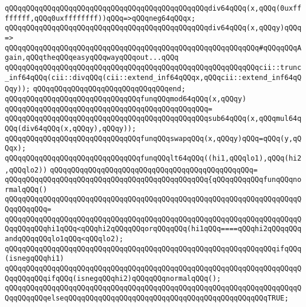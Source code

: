 \verb|qQQqqQQqqQQqqQQqqQQqqQQqqQQqqQQqqQQqqQQqqQQqqQQqdiv64qQQq(x,qQQq(0uxffffffff,qQQq0uxffffffff))qQQq=>qQQqneg64qQQqx;|\newline
\verb|qQQqqQQqqQQqqQQqqQQqqQQqqQQqqQQqqQQqqQQqqQQqqQQqdiv64qQQq(x,qQQqy)qQQq=>|\newline
\verb|qQQqqQQqqQQqqQQqqQQqqQQqqQQqqQQqqQQqqQQqqQQqqQQqqQQqqQQqqQQq#qQQqqQQqAgain,qQQqtheqQQqeasyqQQqwayqQQqout...qQQq|\newline
\verb|qQQqqQQqqQQqqQQqqQQqqQQqqQQqqQQqqQQqqQQqqQQqqQQqqQQqqQQqqQQqcii::trunc_inf64qQQq(cii::divqQQq(cii::extend_inf64qQQqx,qQQqcii::extend_inf64qQQqy));|\newline
\verb|qQQqqQQqqQQqqQQqqQQqqQQqqQQqqQQqend;|\newline
\newline
\verb|qQQqqQQqqQQqqQQqqQQqqQQqqQQqqQQqfunqQQqmod64qQQq(x,qQQqy)|\newline
\verb|qQQqqQQqqQQqqQQqqQQqqQQqqQQqqQQqqQQqqQQqqQQqqQQq=|\newline
\verb|qQQqqQQqqQQqqQQqqQQqqQQqqQQqqQQqqQQqqQQqqQQqqQQqsub64qQQq(x,qQQqmul64qQQq(div64qQQq(x,qQQqy),qQQqy));|\newline
\newline
\verb|qQQqqQQqqQQqqQQqqQQqqQQqqQQqqQQqfunqQQqswapqQQq(x,qQQqy)qQQq=qQQq(y,qQQqx);|\newline
\newline
\verb|qQQqqQQqqQQqqQQqqQQqqQQqqQQqqQQqfunqQQqlt64qQQq((hi1,qQQqlo1),qQQq(hi2,qQQqlo2))|\newline
\verb|qQQqqQQqqQQqqQQqqQQqqQQqqQQqqQQqqQQqqQQqqQQqqQQq=|\newline
\verb|qQQqqQQqqQQqqQQqqQQqqQQqqQQqqQQqqQQqqQQqqQQqqQQq{qQQqqQQqqQQqfunqQQqnormalqQQq()|\newline
\verb|qQQqqQQqqQQqqQQqqQQqqQQqqQQqqQQqqQQqqQQqqQQqqQQqqQQqqQQqqQQqqQQqqQQqqQQqqQQqqQQq=|\newline
\verb|qQQqqQQqqQQqqQQqqQQqqQQqqQQqqQQqqQQqqQQqqQQqqQQqqQQqqQQqqQQqqQQqqQQqqQQqqQQqqQQqhi1qQQq<qQQqhi2qQQqqQQqorqQQqqQQq(hi1qQQq====qQQqhi2qQQqqQQqandqQQqqQQqlo1qQQq<qQQqlo2);|\newline
\newline
\verb|qQQqqQQqqQQqqQQqqQQqqQQqqQQqqQQqqQQqqQQqqQQqqQQqqQQqqQQqqQQqqQQqifqQQq(isnegqQQqhi1)|\newline
\verb|qQQqqQQqqQQqqQQqqQQqqQQqqQQqqQQqqQQqqQQqqQQqqQQqqQQqqQQqqQQqqQQqqQQqqQQqqQQqqQQqifqQQq(isnegqQQqhi2)qQQqqQQqnormalqQQq();|\newline
\verb|qQQqqQQqqQQqqQQqqQQqqQQqqQQqqQQqqQQqqQQqqQQqqQQqqQQqqQQqqQQqqQQqqQQqqQQqqQQqqQQqelseqQQqqQQqqQQqqQQqqQQqqQQqqQQqqQQqqQQqqQQqqQQqqQQqTRUE;|\newline
